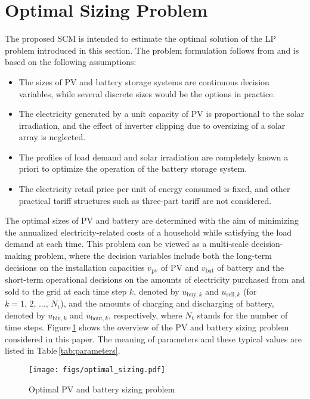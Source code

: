\documentclass[lettersize,journal]{IEEEtran}
\newcommand{\Figref}[1]{Figure\,\ref{#1}}
\newcommand{\tabref}[1]{Table\,\ref{#1}}
\begin{document}
\section{Optimal Sizing Problem} \label{sec:lp}

%
The proposed SCM is intended to estimate the optimal solution of the LP problem introduced in this section. 
The problem formulation follows from \cite{schittekatte18} and is based on the following assumptions: 
\begin{itemize}
    \item The sizes of PV and battery storage systems are continuous decision variables, while several discrete sizes would be the options in practice. \item The electricity generated by a unit capacity of PV is proportional to the solar irradiation, and the effect of inverter clipping due to oversizing of a solar array is neglected. 
    \item The profiles of load demand and solar irradiation are completely known a priori to optimize the operation of the battery storage system. 
    \item The electricity retail price per unit of energy consumed is fixed, and other practical tariff structures such as three-part tariff are not considered. 
\end{itemize}


%
The optimal sizes of PV and battery are determined with the aim of minimizing the annualized electricity-related costs of a household while satisfying the load demand at each time. 
This problem can be viewed as a multi-scale decision-making problem, where the decision variables include both the long-term decisions on the installation capacities $v_\mathrm{pv}$ of PV and $v_\mathrm{bat}$ of battery and the short-term operational decisions on the amounts of electricity purchased from and sold to the grid at each time step $k$, denoted by $u_{\mathrm{buy},k}$ and $u_{\mathrm{sell},k}$ (for $k = 1, \, 2, \,\dots , \, N_\mathrm{t}$), and the amounts of charging and discharging of battery, denoted by $u_{\mathrm{bin},k}$ and $u_{\mathrm{bout},k}$, respectively, where $N_\mathrm{t}$ stands for the number of time steps. 
\Figref{fig:optimal_sizing} shows the overview of the PV and battery sizing problem considered in this paper. 
The meaning of parameters and these typical values are listed in \tabref{tab:parameters}. 


\begin{figure}[!t]
 \centering
 \vspace{2mm}
 \texttt{[image: figs/optimal\_sizing.pdf]} 
 \caption{Optimal PV and battery sizing problem} \label{fig:optimal_sizing}
\end{figure}
\end{document}
